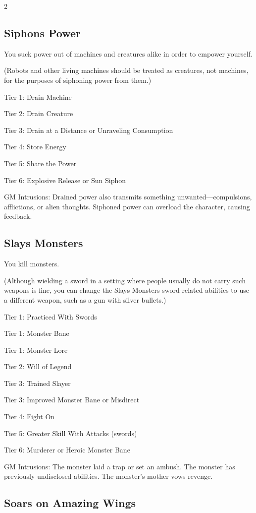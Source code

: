 \begin{multicols}{2}
\subsection{Siphons Power}

You suck power out of machines and creatures alike in order to empower yourself.

(Robots and other living machines should be treated as creatures, not machines, for the purposes of siphoning power from them.)

Tier 1: Drain Machine

Tier 2: Drain Creature

Tier 3: Drain at a Distance or Unraveling Consumption

Tier 4: Store Energy

Tier 5: Share the Power

Tier 6: Explosive Release or Sun Siphon

GM Intrusions: Drained power also transmits something unwanted—compulsions, afflictions, or alien thoughts. Siphoned power can overload the character, causing feedback.

\subsection{Slays Monsters}

You kill monsters.

(Although wielding a sword in a setting where people usually do not carry such weapons is fine, you can change the Slays Monsters sword-related abilities to use a different weapon, such as a gun with silver bullets.)

Tier 1: Practiced With Swords

Tier 1: Monster Bane

Tier 1: Monster Lore

Tier 2: Will of Legend

Tier 3: Trained Slayer

Tier 3: Improved Monster Bane or Misdirect

Tier 4: Fight On

Tier 5: Greater Skill With Attacks (swords)

Tier 6: Murderer or Heroic Monster Bane

GM Intrusions: The monster laid a trap or set an ambush. The monster has previously undisclosed abilities. The monster’s mother vows revenge.

\subsection{Soars on Amazing Wings}


\end{multicols}
